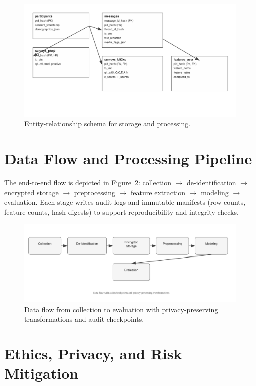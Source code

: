 \begin{figure}[t]
  \centering
  \includegraphics[width=0.9\linewidth]{thesis/figures/schema.svg}
  \caption{Entity-relationship schema for storage and processing.}
  \label{fig:schema}
\end{figure}

\section{Data Flow and Processing Pipeline}
\label{sec:dataset-flow}
The end-to-end flow is depicted in Figure~\ref{fig:data-flow}: collection \(\to\) de-identification \(\to\) encrypted storage \(\to\) preprocessing \(\to\) feature extraction \(\to\) modeling \(\to\) evaluation. Each stage writes audit logs and immutable manifests (row counts, feature counts, hash digests) to support reproducibility and integrity checks.

\begin{figure}[t]
  \centering
  \includegraphics[width=0.95\linewidth]{thesis/figures/data_flow.svg}
  \caption{Data flow from collection to evaluation with privacy-preserving transformations and audit checkpoints.}
  \label{fig:data-flow}
\end{figure}

\section{Ethics, Privacy, and Risk Mitigation}
\label{sec:dataset-ethics}
